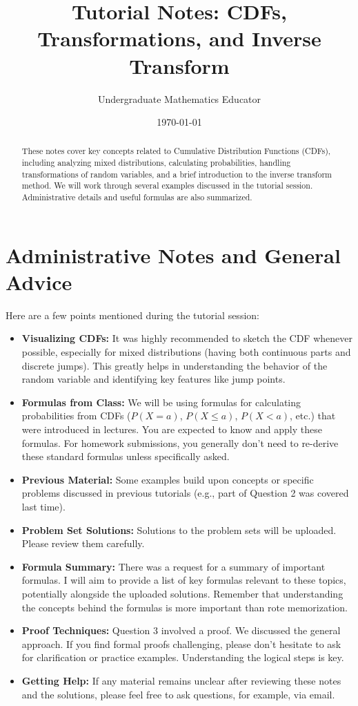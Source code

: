 \documentclass[11pt]{article}
\title{Tutorial Notes: CDFs, Transformations, and Inverse Transform}
\date{\today} %
\author{Undergraduate Mathematics Educator} %
\theoremstyle{mytheoremstyle}
\theoremstyle{mydefinitionstyle}
\begin{document}
\maketitle

\begin{abstract}
These notes cover key concepts related to Cumulative Distribution Functions (CDFs), including analyzing mixed distributions, calculating probabilities, handling transformations of random variables, and a brief introduction to the inverse transform method. We will work through several examples discussed in the tutorial session. Administrative details and useful formulas are also summarized.
\end{abstract}

\section*{Administrative Notes and General Advice}

Here are a few points mentioned during the tutorial session:

\begin{itemize}
    \item \textbf{Visualizing CDFs:} It was highly recommended to sketch the CDF whenever possible, especially for mixed distributions (having both continuous parts and discrete jumps). This greatly helps in understanding the behavior of the random variable and identifying key features like jump points.
    \item \textbf{Formulas from Class:} We will be using formulas for calculating probabilities from CDFs ($P(X=a)$, $P(X \le a)$, $P(X < a)$, etc.) that were introduced in lectures. You are expected to know and apply these formulas. For homework submissions, you generally don't need to re-derive these standard formulas unless specifically asked.
    \item \textbf{Previous Material:} Some examples build upon concepts or specific problems discussed in previous tutorials (e.g., part of Question 2 was covered last time).
    \item \textbf{Problem Set Solutions:} Solutions to the problem sets will be uploaded. Please review them carefully.
    \item \textbf{Formula Summary:} There was a request for a summary of important formulas. I will aim to provide a list of key formulas relevant to these topics, potentially alongside the uploaded solutions. Remember that understanding the concepts behind the formulas is more important than rote memorization.
    \item \textbf{Proof Techniques:} Question 3 involved a proof. We discussed the general approach. If you find formal proofs challenging, please don't hesitate to ask for clarification or practice examples. Understanding the logical steps is key.
    \item \textbf{Getting Help:} If any material remains unclear after reviewing these notes and the solutions, please feel free to ask questions, for example, via email.
\end{itemize}
\end{document}
